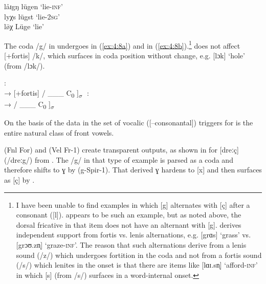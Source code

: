 \ex \label{ex:4:7d} 
låɪgŋ   \tab [lɔɪ.gŋ] \tab  lügen \tab ‘lie-\textsc{inf}’     \\
lyχs    \tab [lʏçs]   \tab  lügst \tab ‘lie-\textsc{2sg}’    \\
l\={ø}χ \tab [løːç]   \tab  Lüge  \tab ‘lie’                  
\z
\z 

The coda /g/ in  undergoes  in (\ref{ex:4:8a}) and  in (\ref{ex:4:8b}).\footnote{{I have been unable to find examples in which [g] alternates with [ç] after a consonant ([l]).  appears to be such an example, but as noted above, the dorsal fricative in that item does not have an alternant with [g].  derives independent support from fortis vs. lenis alternations, e.g. [grɑs] ‘grass’ vs. [grɔʊ.zn̩] ‘graze-}\textrm{\textsc{inf}}\textrm{’. The reason that such alternations derive from a lenis sound (/z/) which undergoes fortition in the coda and not from a fortis sound (/s/) which lenites in the onset is that there are items like [lɑɪ.sn̩] ‘afford-}\textrm{\textsc{inf}}\textrm{’ in which [s] (from /s/) surfaces in a word-internal onset.}}  does not affect [+fortis] /k/, which surfaces in coda position without change, e.g. [lɔk] ‘hole’ (from /lɔk/).

\ea%
    \label{ex:4:8}
\ea\label{ex:4:8a}:\\\relax
            [−sonorant] → [+fortis] / \_\_\_ C\textsubscript{0} ]\textsubscript{${\sigma}$}  ${}$
\ex\label{ex:4:8b}:\smallskip\\
  →  \avm{[+cont]} / \avm{[−cons]} \_\_\_ C\textsubscript{0} ]\textsubscript{${\sigma}$}
\z 
\z 

On the basis of the data in \citet{Larsson1917} the set of vocalic ([--consonantal]) triggers for  is the entire natural class of front vowels.

 (Fnl For) and  (Vel Fr-1) create transparent outputs, as shown in  for [dreːç] (/dreːg/) from . The /g/ in that type of example is parsed as a coda and therefore shifts to {\textbar}ɣ{\textbar} by  (g-Spir-1). That derived {\textbar}ɣ{\textbar} hardens to [x] and then surfaces as [ç] by .

